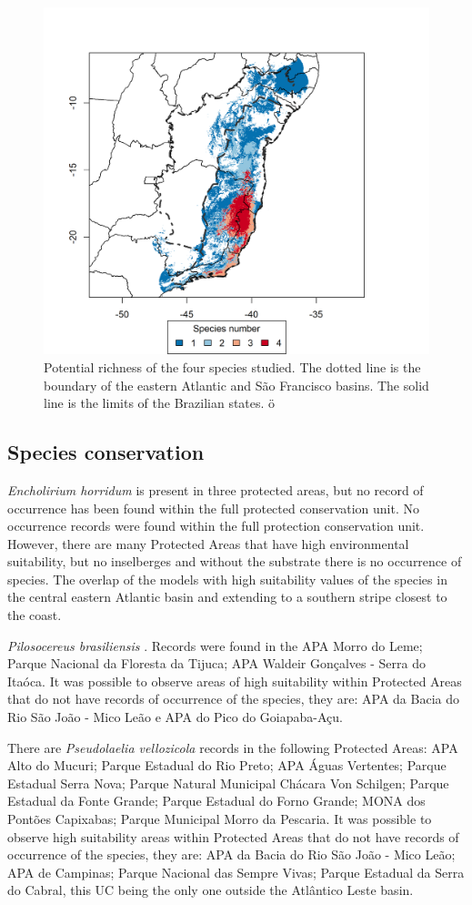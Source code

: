 \begin{figure}
 \centering
 \includegraphics[width=90 mm]{figs/riq_bin.png} 
 \caption{Potential richness of the four species studied. The dotted line is the boundary of the eastern Atlantic and São Francisco basins. The solid line is the limits of the Brazilian states. ö}
  \label{riq}
\end{figure}

\subsection{Species conservation}

\textit{Encholirium horridum} is present in three protected areas, but no record of occurrence has been found within the full protected conservation unit. No occurrence records were found within the full protection conservation unit. However, there are many Protected Areas that have high environmental suitability, but no inselberges and without the substrate there is no occurrence of species. The overlap of the models with high suitability values of the species in the central eastern Atlantic basin and extending to a southern stripe closest to the coast. 

\textit{Pilosocereus brasiliensis} . Records were found in the APA Morro do Leme; Parque Nacional da Floresta da Tijuca; APA Waldeir Gonçalves - Serra do Itaóca. It was possible to observe areas of high suitability within Protected Areas that do not have records of occurrence of the species, they are: APA da Bacia do Rio São João - Mico Leão e APA do Pico do Goiapaba-Açu.

There are \textit{Pseudolaelia vellozicola} records in the following Protected Areas: APA Alto do Mucuri; Parque Estadual do Rio Preto; APA Águas Vertentes; Parque Estadual Serra Nova; Parque Natural Municipal Chácara Von Schilgen; Parque Estadual da Fonte Grande; Parque Estadual do Forno Grande; MONA dos Pontões Capixabas; Parque Municipal Morro da Pescaria. It was possible to observe high suitability areas within Protected Areas that do not have records of occurrence of the species, they are: APA da Bacia do Rio São João - Mico Leão; APA de Campinas; Parque Nacional das Sempre Vivas; Parque Estadual da Serra do Cabral, this UC being the only one outside the Atlântico Leste basin.

